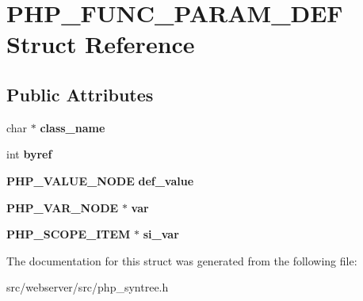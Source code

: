\section{PHP\_\-FUNC\_\-PARAM\_\-DEF Struct Reference}
\label{structPHP__FUNC__PARAM__DEF}
\subsection*{Public Attributes}
\begin{DoxyCompactItemize}
\item 
char $\ast$ {\bfseries class\_\-name}\label{structPHP__FUNC__PARAM__DEF_a4de54d7f14ffa1ca14c53d15e4e66c23}

\item 
int {\bfseries byref}\label{structPHP__FUNC__PARAM__DEF_a545f0302b45fcd472040f1cce42168c8}

\item 
{\bf PHP\_\-VALUE\_\-NODE} {\bfseries def\_\-value}\label{structPHP__FUNC__PARAM__DEF_a558d823941f311e305ea8c09105cf204}

\item 
{\bf PHP\_\-VAR\_\-NODE} $\ast$ {\bfseries var}\label{structPHP__FUNC__PARAM__DEF_a1397856698c03146c6011cb6e8a4d978}

\item 
{\bf PHP\_\-SCOPE\_\-ITEM} $\ast$ {\bfseries si\_\-var}\label{structPHP__FUNC__PARAM__DEF_a74f46fb6c671306d9e7dac4882bf99ec}

\end{DoxyCompactItemize}


The documentation for this struct was generated from the following file:\begin{DoxyCompactItemize}
\item 
src/webserver/src/php\_\-syntree.h\end{DoxyCompactItemize}
